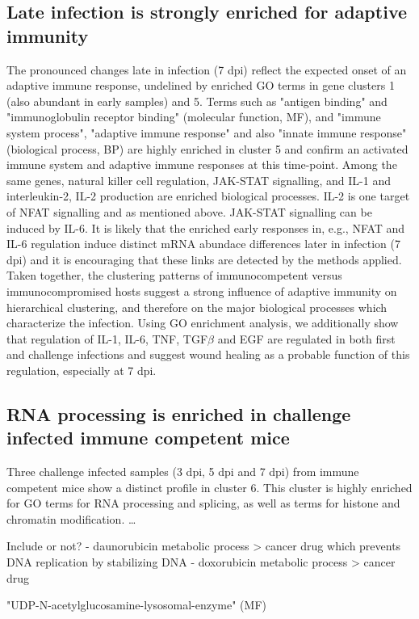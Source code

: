 \documentclass{bmcart}
\begin{document}
\subsection*{Late infection is strongly enriched for adaptive immunity} 
The pronounced changes late in infection (7 dpi) reflect the expected onset of an adaptive immune response, undelined by enriched GO terms in gene clusters 1 (also abundant in early samples) and 5. Terms such as "antigen binding" and "immunoglobulin receptor binding" (molecular function, MF), and "immune system process", "adaptive immune response" and also "innate immune response" (biological process, BP) are highly enriched in cluster 5 and confirm an activated immune system and adaptive immune responses at this time-point. Among the same genes, natural killer cell regulation, JAK-STAT signalling, and IL-1 and interleukin-2, IL-2 production are enriched biological processes. IL-2 is one target of NFAT signalling and as mentioned above. JAK-STAT signalling can be induced by IL-6. It is likely that the enriched early responses in, e.g., NFAT and IL-6 regulation induce distinct mRNA abundace differences later in infection (7 dpi) and it is encouraging that these links are detected by the methods applied. Taken together, the clustering patterns of immunocompetent versus immunocompromised hosts suggest a strong influence of adaptive immunity on hierarchical clustering, and therefore on the major biological processes which characterize the infection. Using GO enrichment analysis, we additionally show that regulation of IL-1, IL-6, TNF, TGF$\beta$ and EGF are regulated in both first and challenge infections and suggest wound healing as a probable function of this regulation, especially at 7 dpi.
 
\subsection*{RNA processing is enriched in challenge infected immune competent mice} 
Three challenge infected samples (3 dpi, 5 dpi and 7 dpi) from immune competent mice show a distinct profile in cluster 6. This cluster is highly enriched for GO terms for RNA processing and splicing, as well as terms for histone and chromatin modification. \ldots

Include or not?
- daunorubicin metabolic process > cancer drug which prevents DNA replication by stabilizing DNA
- doxorubicin metabolic process  > cancer drug

 
"UDP-N-acetylglucosamine-lysosomal-enzyme" (MF)
\end{document}
